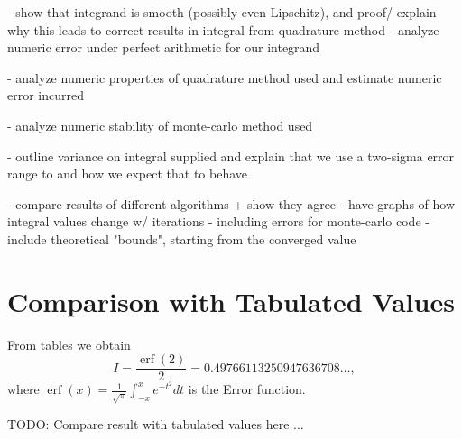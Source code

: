 \documentclass[10pt, a4paper]{article}
\begin{document}
- show that integrand is smooth (possibly even Lipschitz), and proof/ explain why this leads to
  correct results in integral from quadrature method
  - analyze numeric error under perfect arithmetic for our integrand

- analyze numeric properties of quadrature method used and estimate numeric error incurred

- analyze numeric stability of monte-carlo method used

- outline variance on integral supplied and explain that we use a two-sigma error range to
  and how we expect that to behave

- compare results of different algorithms + show they agree
- have graphs of how integral values change w/ iterations
  - including errors for monte-carlo code
  - include theoretical "bounds", starting from the converged value

{}


\appendix{}

\section{Comparison with Tabulated Values}
\label{app:cheat}
From tables we obtain
\begin{equation}
I = \frac{\operatorname{erf}(2)}{2} = 0.49766113250947636708 \dots,
\end{equation}
where $\operatorname{erf}(x) = \frac{1}{\sqrt\pi}\int_{-x}^x e^{-t^2} dt$ is the Error function.

TODO: Compare result with tabulated values here ...
\end{document}
